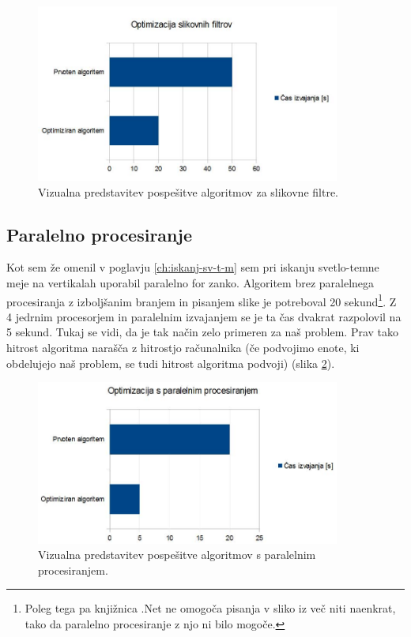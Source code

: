 \documentclass[oneside, a4paper, 12pt]{book}
\begin{document}
\begin{figure}
\begin{center}
\includegraphics[width=10cm]{slike/optimizacija_grafi/optimizacija-slikovnih-filtrov.jpg}
\end{center}
\caption{Vizualna predstavitev pospešitve algoritmov za slikovne filtre.}
\label{pic:opt-sf}
\end{figure}


\subsection{Paralelno procesiranje}
Kot sem že omenil v poglavju \ref{ch:iskanj-sv-t-m} sem pri iskanju svetlo-temne meje na vertikalah uporabil paralelno for zanko. Algoritem brez paralelnega procesiranja z izboljšanim branjem in pisanjem slike je potreboval 20 sekund\footnote{Poleg tega pa knjižnica .Net ne omogoča pisanja v sliko iz več niti naenkrat, tako da paralelno procesiranje z njo ni bilo mogoče.}. Z 4 jedrnim procesorjem in paralelnim izvajanjem se je ta čas dvakrat razpolovil na 5 sekund. Tukaj se vidi, da je tak način zelo primeren za naš problem. Prav tako hitrost algoritma narašča z hitrostjo računalnika (če podvojimo enote, ki obdelujejo naš problem, se tudi hitrost algoritma podvoji) (slika \ref{pic:opt-p}).


\begin{figure}
\begin{center}
\includegraphics[width=10cm]{slike/optimizacija_grafi/optimizacija-s-paralelnim-procesiranjem.jpg}
\end{center}
\caption{Vizualna predstavitev pospešitve algoritmov s paralelnim procesiranjem.}
\label{pic:opt-p}
\end{figure}
\end{document}
